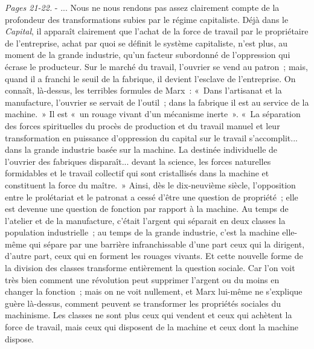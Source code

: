 \documentclass[french,twoside]{book} %
\begin{document}
{\itshape Pages 21-22.} - ... Nous ne nous rendons pas assez clairement compte de la profondeur des transformations subies par le régime capitaliste. Déjà dans le {\itshape Capital}, il apparaît clairement que l'achat de la force de travail par le propriétaire de l'entreprise, achat par quoi se définit le système capitaliste, n'est plus, au moment de la grande industrie, qu'un facteur subordonné de l'oppression qui écrase le producteur. Sur le marché du travail, l'ouvrier se vend au patron ; mais, quand il a franchi le seuil de la fabrique, il devient l'esclave de l'entreprise. On connaît, là-dessus, les terribles formules de Marx : « Dans l'artisanat et la manufacture, l'ouvrier se servait de l'outil ; dans la fabrique il est au service de la machine. » Il est « un rouage vivant d'un mécanisme inerte ». « La séparation des forces spirituelles du procès de production et du travail manuel et leur transformation en puissance d'oppression du capital sur le travail s'accomplit... dans la grande industrie basée sur la machine. La destinée individuelle de l'ouvrier des fabriques disparaît... devant la science, les forces naturelles formidables et le travail collectif qui sont cristallisés dans la machine et constituent la force du maître. » Ainsi, dès le dix-neuvième siècle, l'opposition entre le prolétariat et le patronat a cessé d'être une question de propriété ; elle est devenue une question de fonction par rapport à la machine. Au temps de l'atelier et de la manufacture, c'était l'argent qui séparait en deux classes la population industrielle ; au temps de la grande industrie, c'est la machine elle-même qui sépare par une barrière infranchissable d'une part ceux qui la dirigent, d'autre part, ceux qui en forment les rouages vivants. Et cette nouvelle forme de la division des classes transforme entièrement la question sociale. Car l'on voit très bien comment une révolution peut supprimer l'argent ou du moins en changer la fonction ; mais on ne voit nullement, et Marx lui-même ne s'explique guère là-dessus, comment peuvent se transformer les propriétés sociales du machinisme. Les classes ne sont plus ceux qui vendent et ceux qui achètent la force de travail, mais ceux qui disposent de la machine et ceux dont la machine dispose.\par
\end{document}
